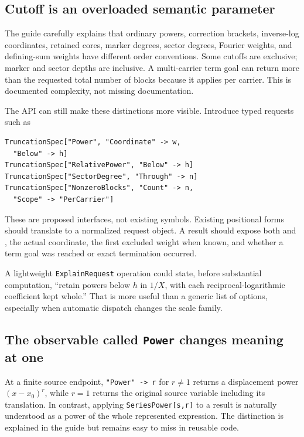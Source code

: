 \subsection{Cutoff is an overloaded semantic parameter}

The guide carefully explains that ordinary powers, correction brackets, inverse-log coordinates, retained cores, marker degrees, sector degrees, Fourier weights, and defining-sum weights have different order conventions. Some cutoffs are exclusive; marker and sector depths are inclusive. A multi-carrier term goal can return more than the requested total number of blocks because it applies per carrier. This is documented complexity, not missing documentation.\cite{guide}

The API can still make these distinctions more visible. Introduce typed requests such as
\begin{lstlisting}
TruncationSpec["Power", "Coordinate" -> w,
  "Below" -> h]
TruncationSpec["RelativePower", "Below" -> h]
TruncationSpec["SectorDegree", "Through" -> n]
TruncationSpec["NonzeroBlocks", "Count" -> n,
  "Scope" -> "PerCarrier"]
\end{lstlisting}
These are proposed interfaces, not existing symbols. Existing positional forms should translate to a normalized request object. A result should expose both  and , the actual coordinate, the first excluded weight when known, and whether a term goal was reached or exact termination occurred.

A lightweight \texttt{ExplainRequest} operation could state, before substantial computation, ``retain powers below $h$ in $1/X$, with each reciprocal-logarithmic coefficient kept whole.'' That is more useful than a generic list of options, especially when automatic dispatch changes the scale family.

\subsection{The observable called \texttt{Power} changes meaning at one}

At a finite source endpoint, \texttt{"Power" -> r} for $r\ne1$ returns a displacement power $(x-x_0)^r$, while $r=1$ returns the original source variable including its translation. In contrast, applying \texttt{SeriesPower[s,r]} to a result is naturally understood as a power of the whole represented expression. The distinction is explained in the guide but remains easy to miss in reusable code.\cite{guide,core,operations}

